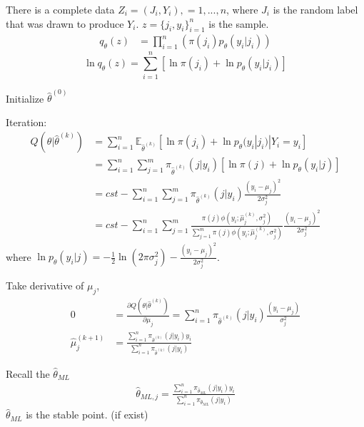 \documentclass[11pt,a4paper]{article}
\begin{document}
There is a complete data $Z_i=(J_i,Y_i),=1,...,n$, where $J_i$ is the random label that was drawn to produce $Y_i$. $z=\{j_i,y_i\}_{i=1}^n$ is the sample.
\begin{equation}
    \begin{aligned}
        q_\theta(z)&=\prod_{i=1}^n\left(\pi(j_i)p_\theta(y_i|j_i)\right)
    \end{aligned}
    \nonumber
\end{equation}
$$\ln q_{\theta}(z)=\sum_{i=1}^n[\ln \pi(j_i)+\ln p_{\theta}(y_i|j_i)]$$

Initialize $\hat{\theta}^{(0)}$

Iteration:
\begin{equation}
    \begin{aligned}
        Q(\theta|\hat{\theta}^{(k)})
        &=\sum_{i=1}^n\mathbb{E}_{\hat{\theta}^{(k)}}[\ln \pi(j_i)+\ln p_{\theta}(y_i|j_i)|Y_i=y_i]\\
        &=\sum_{i=1}^n\sum_{j=1}^m\pi_{\hat{\theta}^{(k)}}(j|y_i)[\ln \pi(j)+\ln p_{\theta}(y_i|j)]\\
        &=cst-\sum_{i=1}^n\sum_{j=1}^m\pi_{\hat{\theta}^{(k)}}(j|y_i)\frac{(y_i-\mu_j)^2}{2\sigma_j^2}\\
        &=cst-\sum_{i=1}^n\sum_{j=1}^m\frac{\pi(j)\phi(y_i ; \hat{\mu}_j^{(k)}, \sigma_j^2)}{\sum_{j=1}^m\pi(j)\phi(y_i ; \hat{\mu}_j^{(k)}, \sigma_j^2)}\frac{(y_i-\mu_j)^2}{2\sigma_j^2}
    \end{aligned}
    \nonumber
\end{equation}
where $\ln p_{\theta}(y_i|j)=-\frac{1}{2}\ln(2\pi\sigma_j^2)-\frac{(y_i-\mu_j)^2}{2\sigma_j^2}$.

Take derivative of $\mu_j$,
\begin{equation}
    \begin{aligned}
        0&=\frac{\partial Q(\theta|\hat{\theta}^{(k)})}{\partial \mu_j}=\sum_{i=1}^n\pi_{\hat{\theta}^{(k)}}(j|y_i)\frac{(y_i-\mu_j)}{\sigma_j^2}\\
        \hat{\mu}_j^{(k+1)}&=\frac{\sum_{i=1}^n\pi_{\hat{\theta}^{(k)}}(j|y_i)y_i}{\sum_{i=1}^n\pi_{\hat{\theta}^{(k)}}(j|y_i)}
    \end{aligned}
    \nonumber
\end{equation}

Recall the $\hat{\theta}_{ML}$
\begin{equation}
    \begin{aligned}
        \hat{\theta}_{ML,j}=\frac{\sum_{i=1}^n\pi_{\hat{\theta}_{ML}}(j|y_i)y_i}{\sum_{i=1}^n\pi_{\hat{\theta}_{ML}}(j|y_i)}
    \end{aligned}
    \nonumber
\end{equation}
$\hat{\theta}_{ML}$ is the stable point. (if exist)
\end{document}
